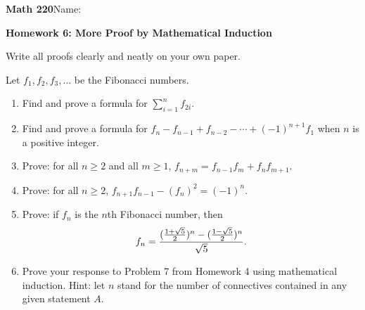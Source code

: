 \documentclass{article}
\begin{document}
{\bf Math 220}\hfill{Name:}

{\bf Homework 6: More Proof by Mathematical Induction}
\vspace{.3in}

Write all proofs clearly and neatly on your own paper.

Let $f_1, f_2, f_3,\ldots$ be the Fibonacci numbers.



\begin{enumerate}

\item Find and prove a formula for $\sum_{i=1}^{n}f_{2i}$.
\item Find and prove a formula for $f_n-f_{n-1}+f_{n-2}-\cdots+(-1)^{n+1}f_1$ when $n$ is a positive integer.

\item Prove: for all $n\geq 2$ and all $m\geq 1$, $f_{n+m}=f_{n-1}f_m+f_nf_{m+1}$.

\item Prove: for all $n\geq 2$, $f_{n+1}f_{n-1}-(f_n)^2=(-1)^n$.

\item Prove: if $f_n$ is the $n$th Fibonacci number, then $$f_n={({1+\sqrt 5\over 2})^n-({1-\sqrt 5\over 2})^n\over \sqrt 5}.$$

\item Prove your response to Problem 7 from Homework 4 using mathematical induction. Hint: let $n$ stand for the number of connectives contained in any given statement  $A$.

\end{enumerate}
\end{document}
